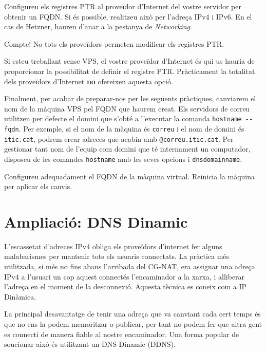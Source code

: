 \documentclass{practicaitic}
\begin{document}
\begin{tasca}
  Configureu els registres PTR al proveïdor d'Internet del vostre servidor per
  obtenir un FQDN. Si és possible, realitzeu això per l'adreça IPv4 i IPv6.
  En el cas de Hetzner, haureu d'anar a la pestanya de \textit{Networking}.

  Compte! No tots els proveïdors permeten modificar els registres PTR.

  Si esteu treballant sense VPS, el vostre proveïdor d'Internet és qui
  us hauria de proporcionar la possibilitat de definir el registre
  PTR. Pràcticament la totalitat dels proveïdors d'Internet
  \textbf{no} ofereixen aquesta opció.
\end{tasca}

Finalment, per acabar de preparar-nos per les següents pràctiques,
canviarem el nom de la màquina VPS pel FQDN que haurem creat. Els
servidors de correu utilitzen per defecte el domini que s'obté a
l'executar la comanda \verb|hostname --fqdn|. Per exemple, si el nom
de la màquina és \verb|correu| i el nom de domini és \verb|itic.cat|,
podrem crear adreces que acabin amb \texttt{@correu.itic.cat}. Per
gestionar tant nom de l'equip com domini que té internament un
computador, disposeu de les comandes \verb|hostname| amb les seves
opcions i \verb|dnsdomainname|.

\begin{tasca}
  Configureu adequadament el FQDN de la màquina virtual. Reinicia
  la màquina per aplicar els canvis.
\end{tasca}

\section{Ampliació: DNS Dinamic}

L'escassetat d'adreces IPv4 obliga els proveïdors d'internet fer alguns
malabarismes per mantenir tots els usuaris connectats. La pràctica més
utilitzada, si més no fins abans l'arribada del CG-NAT, era assignar una
adreça IPv4 a l'usuari un cop aquest connectés l'encaminador a la xarxa, i
alliberar l'adreça en el moment de la desconnexió. Aquesta tècnica es coneix
com a IP Dinàmica.

La principal desavantatge de tenir una adreça que va canviant cada cert temps és
que no ens la podem memoritzar o publicar, per tant no podem fer que altra gent
es connecti de manera fiable al nostre encaminador. Una forma popular de
so\lgem ucionar això és utilitzant un DNS Dinamic (DDNS).
\end{document}
